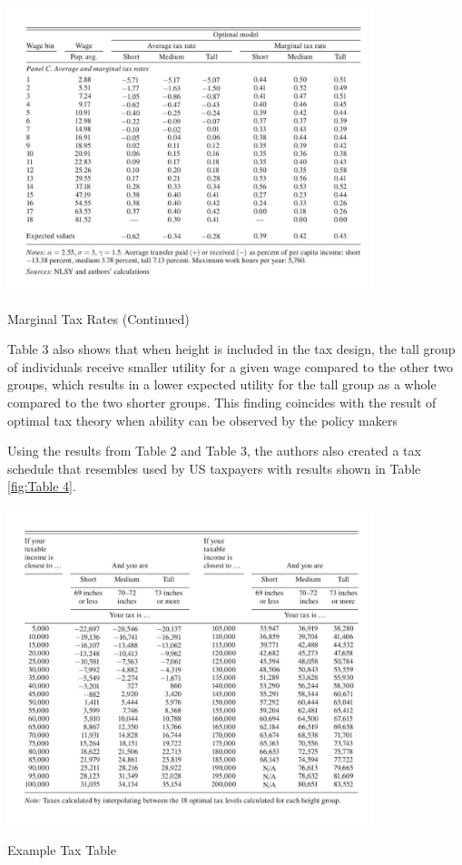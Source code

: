 \documentclass[titlepage]{\econtex}
\begin{document}
\begin{table}[H]
  \centering
  \label{fig:Table 3}
  \includegraphics[width=0.8\textwidth]{OptimalAllocationBaseline2.JPG}
  \caption{Marginal Tax Rates (Continued)}
  \end{table}  
  Table 3 also shows that when height is included in the tax design, the tall group of individuals receive smaller utility for a given wage compared to the other two groups, which results in a lower expected utility for the tall group as a whole compared to the two shorter groups. This finding coincides with the result of optimal tax theory when ability can be observed by the policy makers

Using the results from Table 2 and Table 3, the authors also created a tax schedule that resembles used by US taxpayers with results shown in Table \ref{fig:Table 4}.
  
\begin{table}[H]
  \centering
  \label{fig:Table 4}
  \includegraphics[width=0.8\textwidth]{ExampleTaxTable.JPG}
  \caption{Example Tax Table}
  \end{table}  
\end{document}
